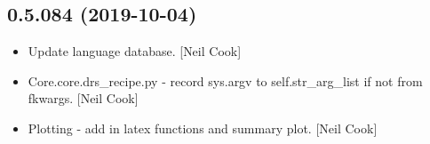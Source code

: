 \documentclass[a4paper,10pt,english]{report}
\begin{document}
\subsection{0.5.084 (2019-10-04)}
\label{\detokenize{misc/changelog:id57}}\begin{itemize}
\item {} 
Update language database. {[}Neil Cook{]}

\item {} 
Core.core.drs\_recipe.py - record sys.argv to self.str\_arg\_list if not
from fkwargs. {[}Neil Cook{]}

\item {} 
Plotting - add in latex functions and summary plot. {[}Neil Cook{]}

\end{itemize}
\end{document}
